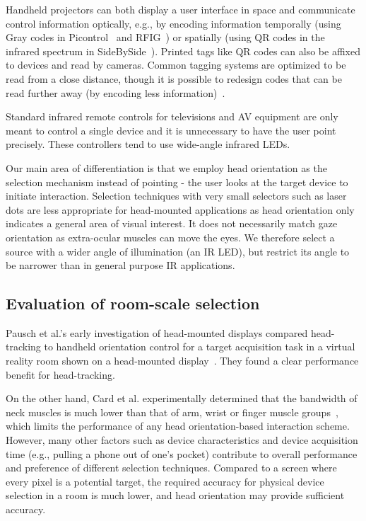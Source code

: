 Handheld projectors can both display a user interface in space and communicate control information optically, e.g., by encoding information temporally (using Gray codes in Picontrol~\cite{schmidt_picontrol:_2012} and RFIG~\cite{raskar_rfig_2004}) or spatially (using QR codes in the infrared spectrum in SideBySide~\cite{willis_sidebyside:_2011}). Printed tags like QR codes can also be affixed to devices and read by cameras. Common tagging systems are optimized to be read from a close distance, though it is possible to redesign codes that can be read further away (by encoding less information)~\cite{cross_low-cost_2012}. 

Standard infrared remote controls for televisions and AV equipment are only meant to control a single device and it is unnecessary to have the user point precisely. These controllers tend to use wide-angle infrared LEDs.

Our main area of differentiation is that we employ head orientation as the selection mechanism instead of pointing - the user looks at the target device to initiate interaction. Selection techniques with very small selectors such as laser dots are less appropriate for head-mounted applications as head orientation only indicates a general area of visual interest. It does not necessarily match gaze orientation as extra-ocular muscles can move the eyes. We therefore select a source with a wider angle of illumination (an IR LED), but restrict its angle to be narrower than in general purpose IR applications.

\subsection{Evaluation of room-scale selection}
Pausch et al.'s early investigation of head-mounted displays compared head-tracking to handheld orientation control for a target acquisition task in a virtual reality room shown on a head-mounted display~\cite{pausch_user_1993}. They found a clear performance benefit for head-tracking.

On the other hand, Card et al. experimentally determined that the bandwidth of neck muscles is much lower than that of arm, wrist or finger muscle groups~\cite{card_morphological_1991}, which limits the performance of any head orientation-based interaction scheme. However, many other factors such as device characteristics and device acquisition time (e.g., pulling a phone out of one's pocket) contribute to overall performance and preference of different selection techniques. Compared to a screen where every pixel is a potential target, the required accuracy for physical device selection in a room is much lower, and head orientation may provide sufficient accuracy.

